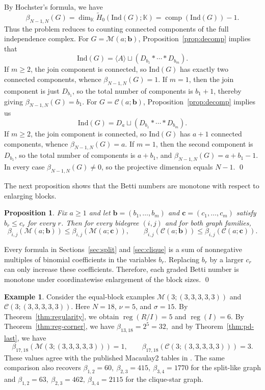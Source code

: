 \documentclass[12pt]{article}
\renewenvironment{proof}{{\bf \noindent Proof.}}{\qed}
\newtheorem{proposition}[theorem]{Proposition}
\theoremstyle{definition}
\newtheorem{example}[theorem]{Example}
\theoremstyle{remark}
\DeclareMathOperator{\reg}{reg}
\DeclareMathOperator{\comp}{comp}
\newcommand{\kk}{\mathbb{K}}
\newcommand{\MM}{\mathcal{M}}
\newcommand{\CC}{\mathcal{C}}
\newcommand{\ind}{\mathrm{Ind}}
\newcommand{\bk}[1]{\mathbf{#1}}
\newcommand{\wt}{\widetilde}
\begin{document}
	\begin{proof}
		By Hochster's formula, we have
		$$
		\beta_{N-1,N}(G)=\dim_{\kk}\wt H_0(\ind(G);\kk)=\comp(\ind(G))-1.
		$$
		Thus the problem reduces to counting connected components of the full independence complex.
		 For $G=\MM(a;\bk{b})$, Proposition~\ref{prop:decomp} implies that
		$$
		\ind(G)=\langle A\rangle \sqcup (D_{b_1}*\cdots *D_{b_m}).
		$$
		If $m\geq 2$, the join component is connected, so $\ind(G)$ has exactly two connected components, whence $\beta_{N-1,N}(G)=1$. If $m=1$, then the join component is just $D_{b_1}$, so the total number of components is $b_1+1$, thereby giving $\beta_{N-1,N}(G)=b_1$.
		 For $G=\CC(a;\bk{b})$, Proposition~\ref{prop:decomp} implies us
		$$
		\ind(G)=D_a \sqcup (D_{b_1}*\cdots *D_{b_m}).
		$$
		If $m\geq 2$, the join component is connected, so $\ind(G)$ has $a+1$ connected components, whence $\beta_{N-1,N}(G)=a$. If $m=1$, then the second component is $D_{b_1}$, so the total number of components is $a+b_1$, and $\beta_{N-1,N}(G)=a+b_1-1$. In every case $\beta_{N-1,N}(G)\neq 0$, so the projective dimension equals $N-1$.
	\end{proof}
	
	 \medskip The next proposition shows that the Betti numbers are monotone with respect to enlarging blocks.
	
	\begin{proposition}\label{prop:monotone}
		Fix $a\geq 1$ and let $\bk{b}=(b_1,\dots,b_m)$ and $\bk{c}=(c_1,\dots,c_m)$ satisfy $b_r\leq c_r$ for every $r$. Then for every bidegree $(i,j)$ and for both graph families,
		$$
		\beta_{i,j}(\MM(a;\bk{b}))\leq \beta_{i,j}(\MM(a;\bk{c})),
		\qquad
		\beta_{i,j}(\CC(a;\bk{b}))\leq \beta_{i,j}(\CC(a;\bk{c})).
		$$
	\end{proposition}
	
	\begin{proof}
		Every formula in Sections~\ref{sec:split} and \ref{sec:clique} is a sum of nonnegative multiples of binomial coefficients in the variables $b_r$. Replacing $b_r$ by a larger $c_r$ can only increase these coefficients. Therefore, each graded Betti number is monotone under coordinatewise enlargement of the block sizes.
	\end{proof}
	
	\medskip
	
	\begin{example}\label{ex:equal-block-recovery}
		Consider the equal-block examples $ \MM(3;(3,3,3,3,3))$ and $	\CC(3;(3,3,3,3,3)). $
		Here $N=18$, $\nu=5$, and $\sigma=15$. By Theorem~\ref{thm:regularity}, we obtain 
		$ \reg(R/I)=5 $  and $\reg(I)=6. $ By Theorem~\ref{thm:reg-corner}, we have  $ \beta_{13,18}=2^5=32, $ and by Theorem~\ref{thm:pd-last}, we have
		$$
		\beta_{17,18}(\MM(3;(3,3,3,3,3)))=1,
		\qquad
		\beta_{17,18}(\CC(3;(3,3,3,3,3)))=3.
		$$
		These values agree with the published Macaulay2 tables in \cite{Rather2024}. The same comparison also recovers
		$ \beta_{1,2}=60,\ \beta_{2,3}=415,\ \beta_{3,4}=1770 $
		for the split-like graph and
		$ \beta_{1,2}=63,\ \beta_{2,3}=462,\ \beta_{3,4}=2115 $
		for the clique-star graph.
	\end{example}
	
\end{document}
